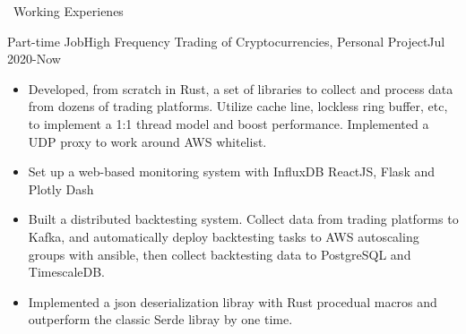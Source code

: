 \documentclass{resume}
\begin{document}
\begin{rSection}{\faUsers~Working Experienes}
\begin{rExperience}{Part-time Job}{High Frequency Trading of Cryptocurrencies, Personal Project}{Jul 2020-Now}
\begin{itemize}
            \item Developed, from scratch in Rust, a set of libraries to collect and process data from dozens of trading platforms. Utilize cache line, lockless ring buffer, etc, to implement a 1:1 thread model and boost performance. Implemented a UDP proxy to work around AWS whitelist.
            \item Set up a web-based monitoring system with InfluxDB ReactJS, Flask and Plotly Dash
            \item Built a distributed backtesting system. Collect data from trading platforms to Kafka, and automatically deploy backtesting tasks to AWS autoscaling groups with ansible, then collect backtesting data to PostgreSQL and TimescaleDB.
            \item Implemented a json deserialization libray with Rust procedual macros and outperform the classic Serde libray by one time.
        \end{itemize}
    \end{rExperience}

\end{rSection}
\end{document}
